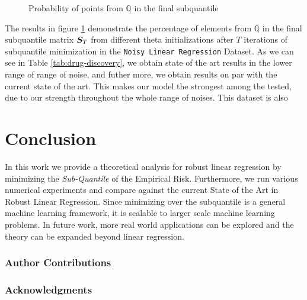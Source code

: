 \documentclass{article} %
\begin{document}
	\begin{figure}
		\begin{center}
			
		\end{center}
		\caption{Probability of points from $\mathbb{Q}$ in the final subquantile}
		\label{fig:structure-subquantile}
	\end{figure}
	
	The results in figure \ref{fig:structure-subquantile} demonstrate the percentage of elements from $\mathbb{Q}$ in the final subquantile matrix ${\bm{S}}_T$ from different theta initializations after $T$ iterations of subquantile minimization in the \texttt{Noisy Linear Regression} Dataset. 
	As we can see in Table \ref{tab:drug-discovery}, we obtain state of the art results in the lower range of range of noise, and futher more, we obtain results on par with the current state of the art. This makes our model the strongest among the tested, due to our strength throughout the whole range of noises. This dataset is also 
	
	\section{Conclusion}
	In this work we provide a theoretical analysis for robust linear regression by minimizing the \textit{Sub-Quantile} of the Empirical Risk. Furthermore, we run various numerical experiments and compare against the current State of the Art in Robust Linear Regression. Since minimizing over the subquantile is a general machine learning framework, it is scalable to larger scale machine learning problems. In future work, more real world applications can be explored and the theory can be expanded beyond linear regression. 
		
	\subsubsection*{Author Contributions}
	
	\subsubsection*{Acknowledgments}	
	
	\newpage

	
	
	
\end{document}
